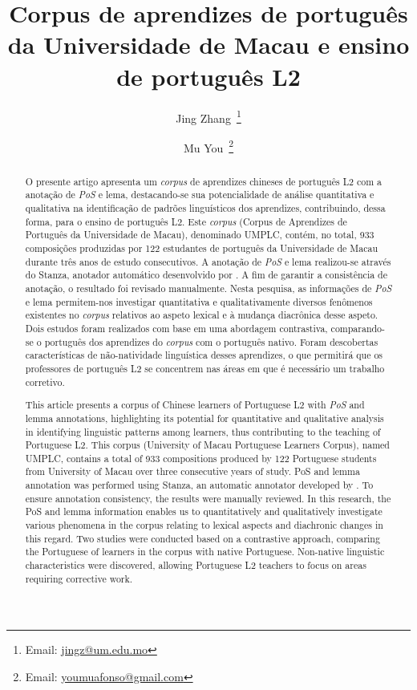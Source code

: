 \documentclass[portuguese]{textolivre}
\title{Corpus de aprendizes de português da Universidade de Macau e ensino de português L2}
\author[1]{Jing Zhang~\orcid{0000-0003-4801-6354}\thanks{Email: \href{mailto:jingz@um.edu.mo}{jingz@um.edu.mo}}}
\author[1]{Mu You~\orcid{0000-0001-5029-3903}\thanks{Email: \href{mailto:youmuafonso@gmail.com}{youmuafonso@gmail.com}}}
\affil[1]{Universidade de Macau, Faculdade de Letras, Departamento de Português, Macau, China.}
\begin{document}
\maketitle

\begin{polyabstract}
\begin{abstract}
O presente artigo apresenta um \textit{corpus} de aprendizes chineses de português L2 com a anotação de \textit{PoS} e lema, destacando-se sua potencialidade de análise quantitativa e qualitativa na identificação de padrões linguísticos dos aprendizes, contribuindo, dessa forma, para o ensino de português L2. Este \textit{corpus} (Corpus de Aprendizes de Português da Universidade de Macau), denominado UMPLC, contém, no total, 933 composições produzidas por 122 estudantes de português da Universidade de Macau durante três anos de estudo consecutivos. A anotação de \textit{PoS} e lema realizou-se através do Stanza, anotador automático desenvolvido por \textcite{qi2020stanza}. A fim de garantir a consistência de anotação, o resultado foi revisado manualmente. Nesta pesquisa, as informações de \textit{PoS} e lema permitem-nos investigar quantitativa e qualitativamente diversos fenômenos existentes no \textit{corpus} relativos ao aspeto lexical e à mudança diacrônica desse aspeto. Dois estudos foram realizados com base em uma abordagem contrastiva, comparando-se o português dos aprendizes do \textit{corpus} com o português nativo. Foram descobertas características de não-natividade linguística desses aprendizes, o que permitirá que os professores de português L2 se concentrem nas áreas em que é necessário um trabalho corretivo. 

\end{abstract}

\begin{english}
\begin{abstract}
This article presents a corpus of Chinese learners of Portuguese L2 with \textit{PoS} and lemma annotations, highlighting its potential for quantitative and qualitative analysis in identifying linguistic patterns among learners, thus contributing to the teaching of Portuguese L2. This corpus (University of Macau Portuguese Learners Corpus), named UMPLC, contains a total of 933 compositions produced by 122 Portuguese students from University of Macau over three consecutive years of study. PoS and lemma annotation was performed using Stanza, an automatic annotator developed by \textcite{qi2020stanza}. To ensure annotation consistency, the results were manually reviewed. In this research, the PoS and lemma information enables us to quantitatively and qualitatively investigate various phenomena in the corpus relating to lexical aspects and diachronic changes in this regard. Two studies were conducted based on a contrastive approach, comparing the Portuguese of learners in the corpus with native Portuguese. Non-native linguistic characteristics were discovered, allowing Portuguese L2 teachers to focus on areas requiring corrective work.


\end{abstract}
\end{english}
\end{polyabstract}
\end{document}
